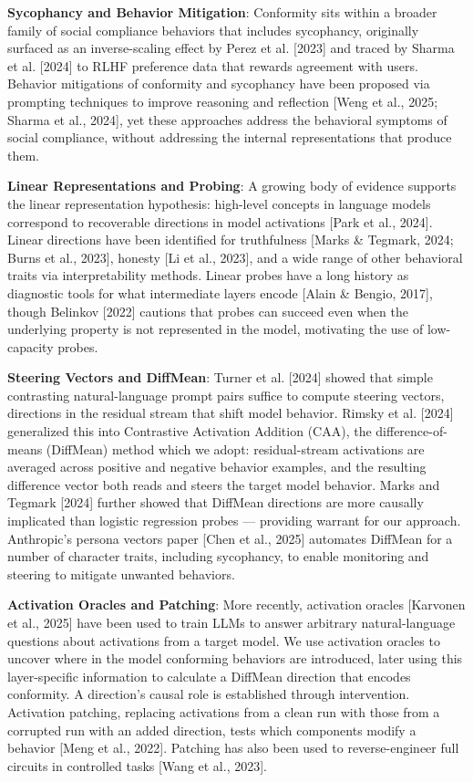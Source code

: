 \documentclass[10pt]{article}
\begin{document}
\textbf{Sycophancy and Behavior Mitigation}: Conformity sits within a broader family of social compliance behaviors that includes sycophancy, originally surfaced as an inverse-scaling effect by Perez et al. [2023] and traced by Sharma et al. [2024] to RLHF preference data that rewards agreement with users. Behavior mitigations of conformity and sycophancy have been proposed via prompting techniques to improve reasoning and reflection [Weng et al., 2025; Sharma et al., 2024], yet these approaches address the behavioral symptoms of social compliance, without addressing the internal representations that produce them.

\textbf{Linear Representations and Probing}: A growing body of evidence supports the linear representation hypothesis: high-level concepts in language models correspond to recoverable directions in model activations [Park et al., 2024]. Linear directions have been identified for truthfulness [Marks \& Tegmark, 2024; Burns et al., 2023], honesty [Li et al., 2023], and a wide range of other behavioral traits via interpretability methods. Linear probes have a long history as diagnostic tools for what intermediate layers encode [Alain \& Bengio, 2017], though Belinkov [2022] cautions that probes can succeed even when the underlying property is not represented in the model, motivating the use of low-capacity probes. 

\textbf{Steering Vectors and DiffMean}: Turner et al. [2024] showed that simple contrasting natural-language prompt pairs suffice to compute steering vectors, directions in the residual stream that shift model behavior. Rimsky et al. [2024] generalized this into Contrastive Activation Addition (CAA), the difference-of-means (DiffMean) method which we adopt: residual-stream activations are averaged across positive and negative behavior examples, and the resulting difference vector both reads and steers the target model behavior. Marks and Tegmark [2024] further showed that DiffMean directions are more causally implicated than logistic regression probes — providing warrant for our approach. Anthropic's persona vectors paper [Chen et al., 2025] automates DiffMean for a number of character traits, including sycophancy, to enable monitoring and steering to mitigate unwanted behaviors. 

\textbf{Activation Oracles and Patching}: More recently, activation oracles [Karvonen et al., 2025] have been used to train LLMs to answer arbitrary natural-language questions about activations from a target model. We use activation oracles to uncover where in the model conforming behaviors are introduced, later using this layer-specific information to calculate a DiffMean direction that encodes conformity. A direction's causal role is established through intervention. Activation patching, replacing activations from a clean run with those from a corrupted run with an added direction, tests which components modify a behavior [Meng et al., 2022]. Patching has also been used to reverse-engineer full circuits in controlled tasks [Wang et al., 2023]. 
\end{document}
